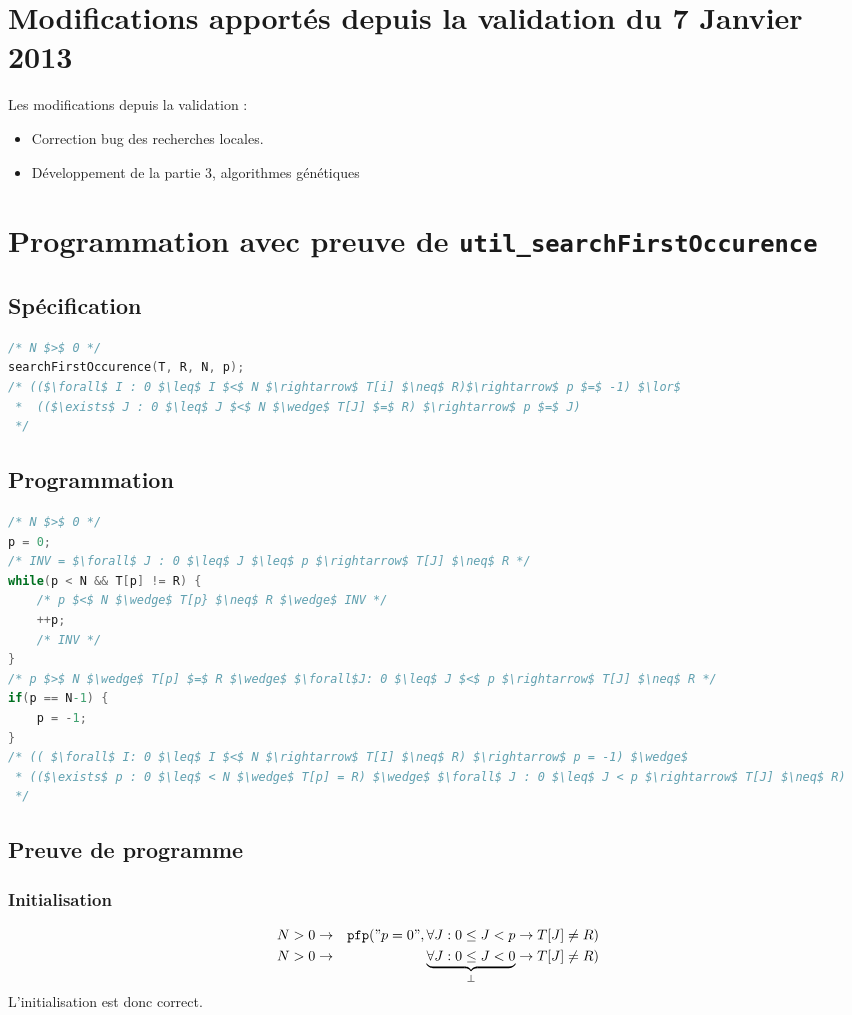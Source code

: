 \documentclass[a4paper, 11pt]{article}
\newcommand{\pfp}{\texttt{pfp}}
\begin{document}
	\section{Modifications apportés depuis la validation du 7 Janvier 2013}
	Les modifications depuis la validation : 
	\begin{itemize}
		\item Correction bug des recherches locales.
		\item Développement de la partie 3, algorithmes génétiques
	\end{itemize}

	\section{Programmation avec preuve de \texttt{util\_searchFirstOccurence}}
	\subsection{Spécification}
\begin{lstlisting}[language=C]
/* N $>$ 0 */
searchFirstOccurence(T, R, N, p);
/* (($\forall$ I : 0 $\leq$ I $<$ N $\rightarrow$ T[i] $\neq$ R)$\rightarrow$ p $=$ -1) $\lor$ 
 *  (($\exists$ J : 0 $\leq$ J $<$ N $\wedge$ T[J] $=$ R) $\rightarrow$ p $=$ J) 
 */
\end{lstlisting}
\subsection{Programmation}
\begin{lstlisting}[language=C]
/* N $>$ 0 */
p = 0;
/* INV = $\forall$ J : 0 $\leq$ J $\leq$ p $\rightarrow$ T[J] $\neq$ R */
while(p < N && T[p] != R) {
	/* p $<$ N $\wedge$ T[p} $\neq$ R $\wedge$ INV */
	++p;
	/* INV */
}
/* p $>$ N $\wedge$ T[p] $=$ R $\wedge$ $\forall$J: 0 $\leq$ J $<$ p $\rightarrow$ T[J] $\neq$ R */
if(p == N-1) {
	p = -1;
}
/* (( $\forall$ I: 0 $\leq$ I $<$ N $\rightarrow$ T[I] $\neq$ R) $\rightarrow$ p = -1) $\wedge$
 * (($\exists$ p : 0 $\leq$ < N $\wedge$ T[p] = R) $\wedge$ $\forall$ J : 0 $\leq$ J < p $\rightarrow$ T[J] $\neq$ R)
 */
\end{lstlisting}

\subsection{Preuve de programme}
\subsubsection{Initialisation}
\begin{eqnarray*}
	N > 0 &\rightarrow& \pfp ("p=0", \forall J : 0 \leq J < p \rightarrow T[J] \neq R)\\
	N > 0 &\rightarrow& \underbrace{\forall J : 0 \leq J < 0}_{\perp} \rightarrow T[J] \neq R)
\end{eqnarray*}
L'initialisation est donc correct.
\end{document}
